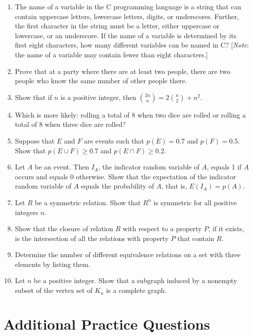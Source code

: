\documentclass[letterpaper, 12pt]{article}
\begin{document}
\begin{enumerate}
    \item  The name of a variable in the C programming language is a string that can contain uppercase letters, lowercase letters, digits, or underscores. Further, the first character in the string must be a letter, either uppercase or lowercase, or an underscore. If the name of a variable is determined by its first eight characters, how many different variables can be named in C? [\textit{Note}: the name of a variable may contain fewer than eight characters.]
    \item  Prove that at a party where there are at least two people, there are two people who know the same number of other people there.
    \item Show that if $n$ is a positive integer, then $\binom{2n}{n} = 2\binom{n}{2} + n^2$.
    \item Which is more likely: rolling a total of 8 when two dice are rolled or rolling a total of 8 when three dice are rolled?
    \item Suppose that $E$ and $F$ are events such that $p(E) = 0.7$ and $p(F) = 0.5$. Show that $p(E \cup F) \geq 0.7$ and $p(E \cap F) \geq 0.2$.
    \item Let $A$ be an event. Then $I_A$, the indicator random variable of $A$, equals 1 if $A$ occurs and equals 0 otherwise. Show that the expectation of the indicator random variable of $A$ equals the probability of $A$, that is, $E(I_A) = p(A)$.
    \item Let $R$ be a symmetric relation. Show that $R^n$ is symmetric for all positive integers $n$.
    \item Show that the closure of relation $R$ with respect to a property $P$, if it exists, is the intersection of all the relations with property $P$ that contain $R$.
    \item Determine the number of different equivalence relations on a set with three elements by listing them.
    \item Let $n$ be a positive integer. Show that a subgraph induced by a nonempty subset of the vertex set of $K_n$ is a complete graph.
\end{enumerate}

\section{Additional Practice Questions}
\end{document}
